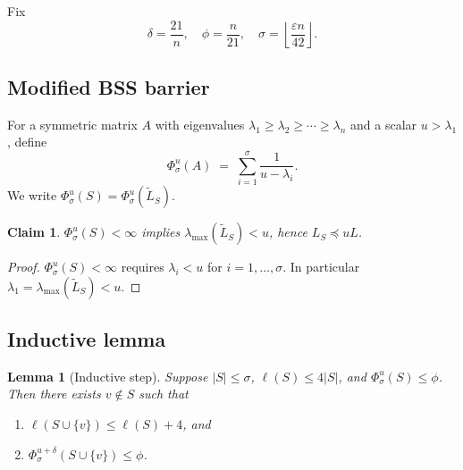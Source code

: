 \documentclass[12pt]{article}
\newtheorem{lemma}[theorem]{Lemma}
\newtheorem{claim}[theorem]{Claim}
\theoremstyle{definition}
\theoremstyle{remark}
\begin{document}
Fix
\[
  \delta=\frac{21}{n},\quad
  \phi=\frac{n}{21},\quad
  \sigma=\!\left\lfloor\frac{\varepsilon n}{42}\right\rfloor.
\]

\subsection{Modified BSS barrier}

For a symmetric matrix $A$ with eigenvalues
$\lambda_1\ge\lambda_2\ge\cdots\ge\lambda_n$
and a scalar $u>\lambda_1$, define
\[
  \Phi_\sigma^u(A) \;=\; \sum_{i=1}^{\sigma}\frac{1}{u-\lambda_i}.
\]
We write $\Phi_\sigma^u(S)=\Phi_\sigma^u(\widetilde{L}_S)$.

\begin{claim}\label{cl:barrier-finite}
$\Phi_\sigma^u(S)<\infty$ implies $\lambda_{\max}(\widetilde{L}_S)<u$,
hence $L_S\preceq u L$.
\end{claim}
\begin{proof}
$\Phi_\sigma^u(S)<\infty$ requires $\lambda_i<u$ for $i=1,\ldots,\sigma$.
In particular $\lambda_1=\lambda_{\max}(\widetilde{L}_S)<u$.
\end{proof}

\subsection{Inductive lemma}

\begin{lemma}[Inductive step]\label{lem:inductive}
Suppose $|S|\le\sigma$, $\ell(S)\le 4|S|$, and
$\Phi_\sigma^u(S)\le\phi$.  Then there exists $v\notin S$ such that
\begin{enumerate}
  \item[\rm(a)] $\ell(S\cup\{v\})\le\ell(S)+4$, and
  \item[\rm(b)] $\Phi_\sigma^{u+\delta}(S\cup\{v\})\le\phi$.
\end{enumerate}
\end{lemma}
\end{document}
